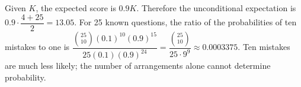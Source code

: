 Given $K$, the expected score is $0.9K$. Therefore the unconditional expectation is $0.9\cdot\dfrac{4+25}{2}=\boxed{13.05}$. For 25 known questions, the ratio of the probabilities of ten mistakes to one is $\dfrac{\binom{25}{10}(0.1)^{10}(0.9)^{15}}{25(0.1)(0.9)^{24}}=\dfrac{\binom{25}{10}}{25\cdot9^9}\approx0.0003375$. Ten mistakes are much less likely; the number of arrangements alone cannot determine probability.
